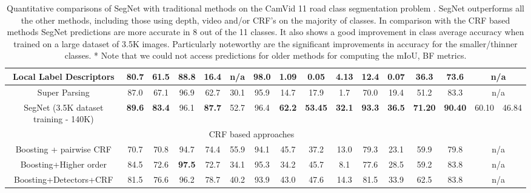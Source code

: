 \documentclass[10pt,journal,compsoc]{IEEEtran}
\begin{document}
\begin{table*}[th]
{{\begin{tabular}{c|c|c|c|c|c|c|c|c|c|c|c|cccc}
				Local Label Descriptors  \cite{yang2012local}  & 80.7     & 61.5 & 88.8 & 16.4 & n/a         & 98.0 & 1.09       & 0.05  & 4.13        & 12.4     & 0.07      & 36.3       & 73.6    & \multicolumn{2}{c}{n/a}    \\ \hline
				
				Super Parsing   \cite{tighe2013superparsing}           & 87.0     & 67.1 & 96.9 & 62.7 & 30.1        & 95.9 & 14.7       & 17.9  & 1.7         & 70.0     & 19.4      & 51.2       & 83.3    & \multicolumn{2}{c}{n/a}     \\ \hline
SegNet (3.5K dataset training - 140K)          & \textbf{89.6}     & \textbf{83.4}  & 96.1 & \textbf{87.7} & 52.7 & 96.4 & \textbf{62.2} & \textbf{53.45} & \textbf{32.1}  & \textbf{93.3} & \textbf{36.5}  & \textbf{71.20}      & \textbf{90.40}   &60.10    &  46.84 \\ \hline
				\multicolumn{15}{c}{CRF based approaches}                                                                                                       \\ \hline
				
				Boosting + pairwise CRF  \cite{Sturgess} & 70.7     & 70.8 & 94.7 & 74.4 & 55.9        & 94.1 & 45.7       & 37.2  & 13.0        & 79.3     & 23.1      & 59.9       & 79.8  & \multicolumn{2}{c}{n/a}       \\ \hline
				
				Boosting+Higher order \cite{Sturgess}    & 84.5     & 72.6 & \textbf{97.5} & 72.7 & 34.1        & 95.3 & 34.2       & 45.7  & 8.1         & 77.6     & 28.5      & 59.2       & 83.8    & \multicolumn{2}{c}{n/a}     \\ \hline
				
				Boosting+Detectors+CRF \cite{LadickyECCV}   & 81.5     & 76.6 & 96.2 & 78.7 & 40.2        & 93.9 & 43.0       & 47.6  & 14.3        & 81.5     & 33.9      & 62.5       & 83.8    & \multicolumn{2}{c}{n/a}     \\ \hline
			\end{tabular}
	}}
	\vspace*{0.1cm}
	\caption{\footnotesize{Quantitative comparisons of SegNet with traditional methods on the CamVid 11 road class segmentation problem \cite{GabeDataset}. SegNet outperforms all the other methods, including those using depth, video and/or CRF's on the majority of classes. In comparison with the CRF based methods SegNet predictions are more accurate in 8 out of the 11 classes. It also shows a good  improvement in class average accuracy when trained on a large dataset of 3.5K images. Particularly noteworthy are the significant improvements in accuracy for the smaller/thinner classes. * Note that we could not access predictions for older methods for computing the mIoU, BF metrics.
	}}
	\label{CamVidQuant}
\end{table*}
\end{document}
